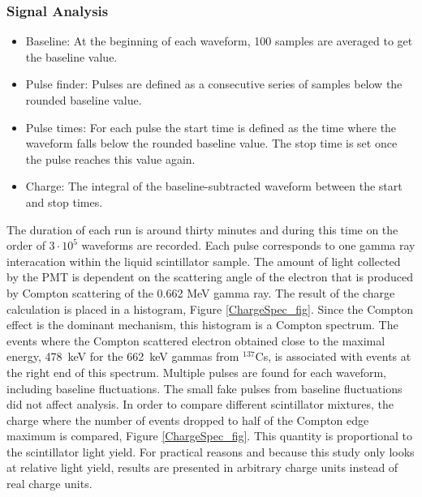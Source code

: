 \documentclass{JINST}
\begin{document}
\subsubsection{Signal Analysis}
\begin{itemize}
\item Baseline: At the beginning of each waveform, 100 samples are averaged to get the baseline value. 
\item Pulse finder: Pulses are defined as a consecutive series of samples below the rounded baseline value.
\item Pulse times: For each pulse the start time is defined as the time where the waveform falls below the rounded baseline value. The stop time is set once the pulse reaches this value again.  
\item Charge: The integral of the baseline-subtracted waveform between the start and stop times.  
\end{itemize}

The duration of each run is around thirty minutes and during this time on the order of $3\cdot10^5$ waveforms are recorded. Each pulse corresponds to one gamma ray interacation within the liquid scintillator sample. The amount of light collected by the PMT is dependent on the scattering angle of the electron that is produced by Compton scattering of the 0.662 MeV gamma ray. The result of the charge calculation is placed in a histogram, Figure \ref{ChargeSpec_fig}. Since the Compton effect is the dominant mechanism, this histogram is a Compton spectrum. The events where the Compton scattered electron obtained close to the maximal energy, 478~keV for the 662~keV gammas from $^{137}$Cs, is associated with events at the right end of this spectrum. %
Multiple pulses are found for each waveform, including baseline fluctuations. The small fake pulses from baseline fluctuations did not affect analysis. In order to compare different scintillator mixtures, the charge where the number of events dropped to half of the Compton edge maximum is compared, Figure \ref{ChargeSpec_fig}. This quantity is proportional to the scintillator light yield. For practical reasons and because this study only looks at relative light yield, results are presented in arbitrary charge units instead of real charge units.
\end{document}
